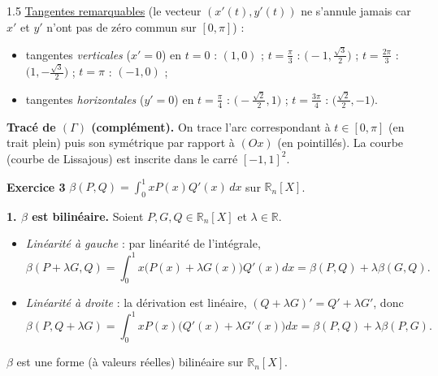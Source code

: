 \documentclass[12pt]{article}
\begin{document}
\begin{spacing}{1.5}
\underline{Tangentes remarquables} (le vecteur $(x'(t),y'(t))$ ne s'annule jamais car $x'$ et $y'$ n'ont pas de zéro commun sur $[0,\pi]$) :
\begin{itemize}
\item tangentes \emph{verticales} ($x'=0$) en $t=0$ : $(1,0)$ ; $t=\frac\pi3$ : $\big(-1,\frac{\sqrt3}2\big)$ ; $t=\frac{2\pi}3$ : $\big(1,-\frac{\sqrt3}2\big)$ ; $t=\pi$ : $(-1,0)$ ;
\item tangentes \emph{horizontales} ($y'=0$) en $t=\frac\pi4$ : $\big(-\frac{\sqrt2}2,1\big)$ ; $t=\frac{3\pi}4$ : $\big(\frac{\sqrt2}2,-1\big)$.
\end{itemize}

\textbf{Tracé de $(\Gamma)$ (complément).} On trace l'arc correspondant à $t\in[0,\pi]$ (en trait plein) puis son symétrique par rapport à $(Ox)$ (en pointillés). La courbe (courbe de Lissajous) est inscrite dans le carré $[-1,1]^2$.
\begin{center}
\end{center}

\medskip\textbf{Exercice 3} \quad $\beta(P,Q)=\displaystyle\int_0^1xP(x)Q'(x)\,dx$ sur $\mathbb{R}_n[X]$.

\textbf{1. $\beta$ est bilinéaire.} Soient $P,G,Q\in\mathbb{R}_n[X]$ et $\lambda\in\mathbb{R}$.
\begin{itemize}
\item \emph{Linéarité à gauche} : par linéarité de l'intégrale,
\[
\beta(P+\lambda G,Q)=\int_0^1x\big(P(x)+\lambda G(x)\big)Q'(x)dx=\beta(P,Q)+\lambda\beta(G,Q).
\]
\item \emph{Linéarité à droite} : la dérivation est linéaire, $(Q+\lambda G)'=Q'+\lambda G'$, donc
\[
\beta(P,Q+\lambda G)=\int_0^1xP(x)\big(Q'(x)+\lambda G'(x)\big)dx=\beta(P,Q)+\lambda\beta(P,G).
\]
\end{itemize}
$\beta$ est une forme (à valeurs réelles) bilinéaire sur $\mathbb{R}_n[X]$.


\end{spacing}
\end{document}
